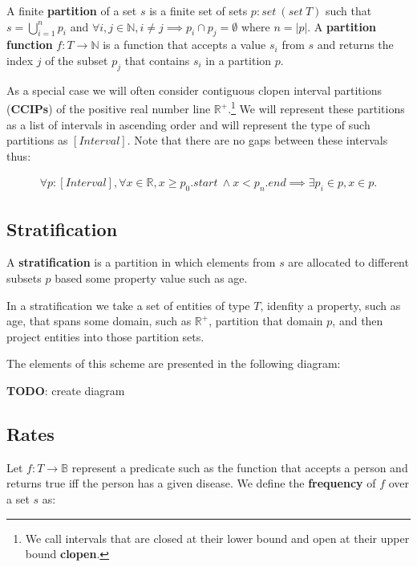 \documentclass[]{article}
\begin{document}
A finite \textbf{partition} of a set \(s\) is a finite set of sets
\(p : set\ (set\ T)\) such that \(s = \bigcup_{i=1}^n p_i\) and
\(\forall i, j \in \mathbb{N}, i \neq j \implies p_i \cap p_j = \emptyset\)
where \(n = |p|\). A \textbf{partition function}
\(f : T \rightarrow \mathbb{N}\) is a function that accepts a value
\(s_i\) from \(s\) and returns the index \(j\) of the subset \(p_j\)
that contains \(s_i\) in a partition \(p\).

As a special case we will often consider contiguous clopen interval
partitions (\textbf{CCIPs}) of the positive real number line
\(\mathbb{R}^+\).\footnote{We call intervals that are closed at their
  lower bound and open at their upper bound \textbf{clopen}.} We will
represent these partitions as a list of intervals in ascending order and
will represent the type of such partitions as \([Interval]\). Note that
there are no gaps between these intervals thus:

\begin{align*}
\forall p : [Interval], \forall x \in \mathbb{R}, x \ge p_0.start\ \wedge x < p_n.end \implies \exists p_i \in p, x \in p.
\end{align*}

\hypertarget{stratification}{%
\subsection{Stratification}\label{stratification}}

A \textbf{stratification} is a partition in which elements from \(s\)
are allocated to different subsets \(p\) based some property value such
as age.

In a stratification we take a set of entities of type \(T\), idenfity a
property, such as age, that spans some domain, such as \(\mathbb{R}^+\),
partition that domain \(p\), and then project entities into those
partition sets.

The elements of this scheme are presented in the following diagram:

\textbf{TODO}: create diagram

\hypertarget{rates}{%
\subsection{Rates}\label{rates}}

Let \(f : T \rightarrow \mathbb{B}\) represent a predicate such as the
function that accepts a person and returns true iff the person has a
given disease. We define the \textbf{frequency} of \(f\) over a set
\(s\) as:
\end{document}
